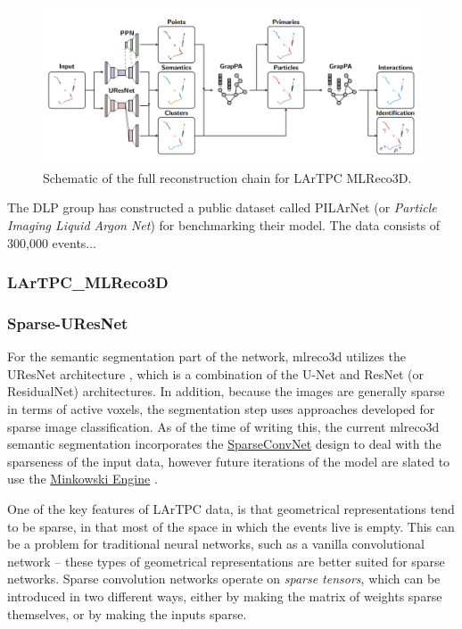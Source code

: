 \documentclass[8pt]{refart}
\begin{document}
\begin{figure}[H]
    \centering
    \includegraphics[width=\linewidth]{graphics/full_chain.png}
    \caption{Schematic of the full reconstruction chain for LArTPC MLReco3D.}
    \label{full_chain}
\end{figure}

 The DLP group has constructed a public dataset called PILArNet \cite{PILArNet} (or \textit{Particle Imaging Liquid Argon Net}) for benchmarking their model.  The data consists of 300,000 events...

\subsubsection{LArTPC\_MLReco3D}

\subsubsection{Sparse-UResNet}\label{uresnet}
For the semantic segmentation part of the network, mlreco3d utilizes the UResNet architecture \cite{UResNet,UNet}, which is a combination of the U-Net \cite{UNet} and ResNet (or ResidualNet) \cite{ResNet} architectures.  In addition, because the images are generally sparse in terms of active voxels, the segmentation step uses approaches developed for sparse image classification.  As of the time of writing this, the current mlreco3d semantic segmentation incorporates the \href{https://github.com/facebookresearch/SparseConvNet}{SparseConvNet} design \cite{SparseConvNet1, SparseConvNet2,Graham} to deal with the sparseness of the input data, however future iterations of the model are slated to use the \href{https://github.com/NVIDIA/MinkowskiEngine}{Minkowski Engine} \cite{MinkowskiEngine}.

One of the key features of LArTPC data, is that geometrical representations tend to be sparse, in that most of the space in which the events live is empty.  This can be a problem for traditional neural networks, such as a vanilla convolutional network -- these types of geometrical representations are better suited for sparse networks.  Sparse convolution networks operate on \textit{sparse tensors}, which can be introduced in two different ways, either by making the matrix of weights sparse themselves, or by making the inputs sparse.  
\end{document}
